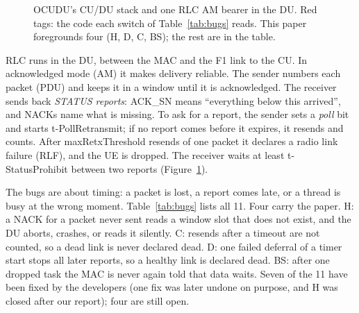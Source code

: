 \documentclass[sigconf,10pt]{acmart}
\newcommand{\sw}[1]{\textsf{\small #1}}
\begin{document}
\begin{figure}[t]
{}
\caption{OCUDU's CU/DU stack and one RLC AM bearer in the DU.
Red tags: the code each switch of Table~\ref{tab:bugs} reads. This paper
foregrounds four (\sw{H}, \sw{D}, \sw{C}, \sw{BS}); the rest are in the
table.}
\label{fig:rlc}
\end{figure}

RLC runs in the DU, between the MAC and the F1 link to the CU. In
acknowledged mode (AM) it makes delivery reliable. The sender numbers
each packet (PDU) and keeps it in a window until it is acknowledged. The
receiver sends back \emph{STATUS reports}: ACK\_SN means ``everything
below this arrived'', and NACKs name what is missing. To ask for a
report, the sender sets a \emph{poll} bit and starts t-PollRetransmit; if
no report comes before it expires, it resends and counts. After
maxRetxThreshold resends of one packet it declares a radio link failure
(RLF), and the UE is dropped. The receiver waits at least
t-StatusProhibit between two reports (Figure~\ref{fig:rlc}).

The bugs are about timing: a packet is lost, a report comes late, or a
thread is busy at the wrong moment. Table~\ref{tab:bugs} lists all 11.
Four carry the paper. \sw{H}: a NACK for a packet never sent reads a
window slot that does not exist, and the DU aborts, crashes, or reads it
silently. \sw{C}: resends after a timeout are not counted, so a dead link
is never declared dead. \sw{D}: one failed deferral of a timer start
stops all later reports, so a healthy link is declared dead. \sw{BS}:
after one dropped task the MAC is never again told that data waits. Seven
of the 11 have been fixed by the developers (one fix was later undone on
purpose, and \sw{H} was closed after our report); four are still open.
\end{document}
